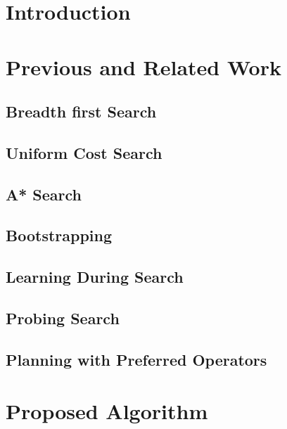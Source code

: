 \documentclass{report}
\begin{document}
\begin{abstract}
\end{abstract}

\section{Introduction}

\section{Previous and Related Work}

\subsection{Breadth first Search}
\subsection{Uniform Cost Search}
\subsection{A* Search}
\subsection{Bootstrapping}
\subsection{Learning During Search}
\subsection{Probing Search}
\subsection{Planning with Preferred Operators}


\section{Proposed Algorithm}
\end{document}
